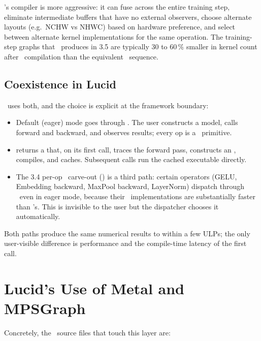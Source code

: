 \MPSGraph's compiler is more aggressive: it can fuse across the
entire training step, eliminate intermediate buffers that have no
external observers, choose alternate layouts (e.g.\ NCHW vs NHWC)
based on hardware preference, and select between alternate kernel
implementations for the same operation. The training-step graphs
that \Lucid\ produces in 3.5 are typically 30 to 60\,\% smaller in
kernel count after \MPSGraph\ compilation than the equivalent
\MLX\ sequence.

\subsection{Coexistence in Lucid}
\label{ssec:metal_mpsgraph:coexistence}

\Lucid\ uses both, and the choice is explicit at the framework
boundary:

\begin{itemize}
  \item Default (eager) mode goes through \MLX. The user constructs
    a model, calls forward and backward, and observes results;
    every op is a \MLX\ primitive.
  \item {} returns a 
    that, on its first call, traces the forward pass, constructs
    an \MPSGraph, compiles, and caches. Subsequent calls run the
    cached executable directly.
  \item The 3.4 per-op \MPSGraph\ carve-out
    () is a third path: certain
    operators (GELU, Embedding backward, MaxPool backward,
    LayerNorm) dispatch through \MPSGraph\ even in eager mode,
    because their \MPSGraph\ implementations are substantially
    faster than \MLX's. This is invisible to the user but the
    dispatcher chooses it automatically.
\end{itemize}

Both paths produce the same numerical results to within a few
ULPs; the only user-visible difference is performance and the
compile-time latency of the first call.

\section{Lucid's Use of Metal and MPSGraph}
\label{sec:metal_mpsgraph:lucid_use}

Concretely, the \Lucid\ source files that touch this layer are:

